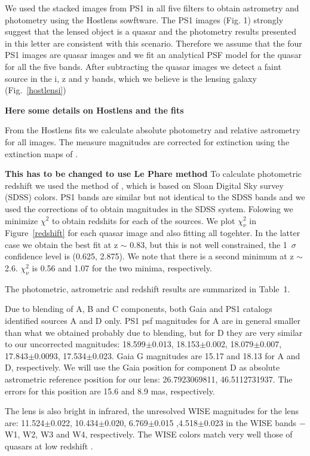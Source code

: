 \documentclass[manuscript]{aastex}
\begin{document}
We used the stacked images from PS1 in all five filters to obtain astrometry and photometry using the Hostlens sowftware.
The PS1 images (Fig. 1) strongly suggest that the lensed object is a quasar and the photometry results presented in this letter are consistent with this scenario. Therefore we assume that the four PS1 images are quasar images and we fit an analytical PSF model for the quasar for all the five bands. After subtracting the quasar images we detect a faint source in the i, z and y bands, which we believe is the lensing galaxy (Fig.~\ref{hostlensi})

{\bf Here some details on Hostlens and the fits}

From the Hostlens fits we calculate absolute photometry and relative astrometry for all images. The measure magnitudes are corrected for extinction using the extinction maps of \citet{sch11}.

{\bf This has to be changed to use Le Phare method }
To calculate photometric redshift we used the method of \citet{wu10}, which is based on Sloan Digital Sky survey (SDSS) colors. PS1 bands are similar but not identical to the SDSS bands and we used the corrections of \citep{fin16} to obtain magnitudes in the SDSS system. Folowing \citet{wu10} we minimize ${\chi}^2$ to obtain redshits for each of the sources. We plot $\chi^2_{\nu}$ in Figure~\ref{redshift} for each quasar image and also fitting all togehter. In the latter case we obtain the best fit at z $\sim$ 0.83, but this is not well constrained, the 1~$\sigma$ confidence level is (0.625,  2.875). We note that there is a second minimum at z $\sim$ 2.6. $\chi^2_{\nu}$ is 0.56 and 1.07 for the two minima, respectively.

The photometric, astrometric and redshift results are summarized in Table~1. 

Due to blending of A, B and C components, both Gaia \citep{gaia} and PS1 catalogs identified sources A and D only. 
PS1 psf magnitudes for A are in general smaller than what we obtained probably due to blending, but for D they are very similar to our uncorrected magnitudes: 18.599$\pm$0.013,  18.153$\pm$0.002,  18.079$\pm$0.007,  17.843$\pm$0.0093,  17.534$\pm$0.023. Gaia G magnitudes are 15.17 and 18.13 for A and D, respectively.
We will use the Gaia position for component D as absolute astrometric reference position for our lens: 26.7923069811, 46.5112731937. The errors for this position are 15.6 and 8.9 mas, respectively.

The lens is also bright in infrared, the unresolved WISE magnitudes for the lens are: 11.524$\pm$0.022, 10.434$\pm$0.020, 6.769$\pm$0.015 ,4.518$\pm$0.023  in the WISE bands $-$ W1, W2, W3 and W4, respectively. The WISE colors match very well those of quasars at low redshift \citep[e.g.][]{mat12}.
\end{document}
